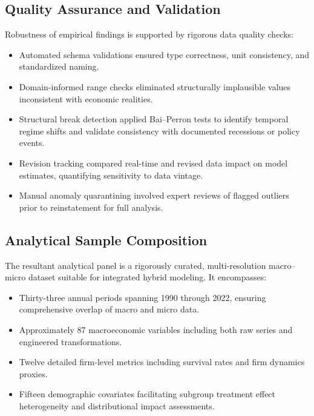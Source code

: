 \subsection{Quality Assurance and Validation}\label{subsec:data_quality}

Robustness of empirical findings is supported by rigorous data quality checks:

\begin{itemize}
  \item Automated schema validations ensured type correctness, unit consistency, and standardized naming.

  \item Domain-informed range checks eliminated structurally implausible values inconsistent with economic realities.

  \item Structural break detection applied Bai--Perron tests to identify temporal regime shifts and validate consistency with documented recessions or policy events.

  \item Revision tracking compared real-time and revised data impact on model estimates, quantifying sensitivity to data vintage.

  \item Manual anomaly quarantining involved expert reviews of flagged outliers prior to reinstatement for full analysis.
\end{itemize}

\subsection{Analytical Sample Composition}\label{subsec:analytical_sample}

The resultant analytical panel is a rigorously curated, multi-resolution macro--micro dataset suitable for integrated hybrid modeling. It encompasses:

\begin{itemize}
  \item Thirty-three annual periods spanning 1990 through 2022, ensuring comprehensive overlap of macro and micro data.

  \item Approximately 87 macroeconomic variables including both raw series and engineered transformations.

  \item Twelve detailed firm-level metrics including survival rates and firm dynamics proxies.

  \item Fifteen demographic covariates facilitating subgroup treatment effect heterogeneity and distributional impact assessments.
\end{itemize}

